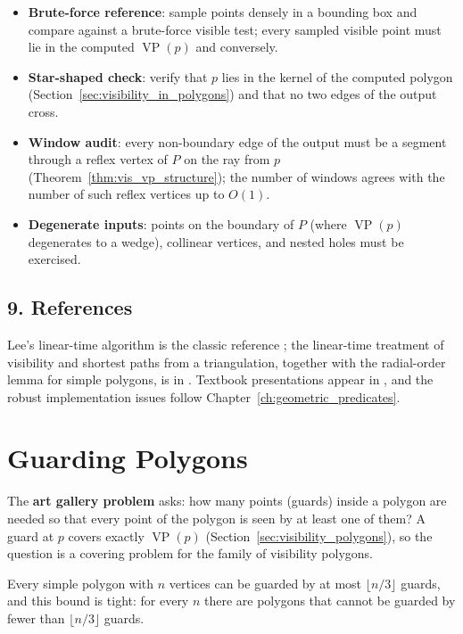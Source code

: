 \begin{itemize}
\item \textbf{Brute-force reference}: sample points densely in a bounding
  box and compare against a brute-force visible test; every sampled visible
  point must lie in the computed $\operatorname{VP}(p)$ and conversely.
\item \textbf{Star-shaped check}: verify that $p$ lies in the kernel of the
  computed polygon (Section~\ref{sec:visibility_in_polygons}) and that no
  two edges of the output cross.
\item \textbf{Window audit}: every non-boundary edge of the output must be a
  segment through a reflex vertex of $P$ on the ray from $p$
  (Theorem~\ref{thm:vis_vp_structure}); the number of windows agrees with
  the number of such reflex vertices up to $O(1)$.
\item \textbf{Degenerate inputs}: points on the boundary of $P$ (where
  $\operatorname{VP}(p)$ degenerates to a wedge), collinear vertices, and
  nested holes must be exercised.
\end{itemize}

\subsection{9. References}

Lee's linear-time algorithm is the classic reference \cite{lee1983};
the linear-time treatment of visibility and shortest paths from a
triangulation, together with the radial-order lemma for simple polygons, is
in \cite{guibas1987vis}. Textbook presentations appear in \cite{orourke1987,
berg2008,laszlo1996}, and the robust implementation issues follow
Chapter~\ref{ch:geometric_predicates}.


\section{Guarding Polygons}
\label{sec:visibility_guarding}

The \textbf{art gallery problem} asks: how many
points (guards) inside a polygon are needed so that every point of the
polygon is seen by at least one of them? A guard at $p$ covers exactly
$\operatorname{VP}(p)$ (Section~\ref{sec:visibility_polygons}), so the
question is a covering problem for the family of visibility polygons.

\begin{theorem}\label{thm:vis_art_gallery}
  Every simple polygon with $n$ vertices can be guarded by at most
  $\lfloor n/3 \rfloor$ guards, and this bound is tight: for every $n$
  there are polygons that cannot be guarded by fewer than $\lfloor n/3
  \rfloor$ guards.
\end{theorem}

